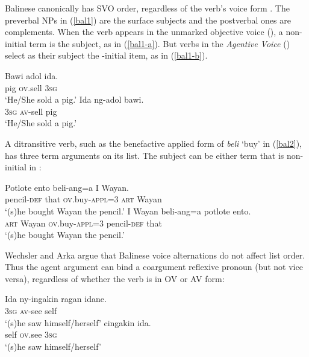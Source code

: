 \documentclass[output=paper
	        ,collection
	        ,collectionchapter
 	        ,biblatex
                ,babelshorthands
                ,newtxmath
                ,draftmode
                ,colorlinks, citecolor=brown
]{langscibook}
\begin{document}
 Balinese canonically has SVO order, regardless of the verb's voice form \citep{Artawa1994, Wechsler+Arka:1998}.  The preverbal NPs in  (\ref{bal1}) are the surface subjects and the postverbal ones are complements.  When the verb appears in the unmarked objective voice (), a non-initial term is the subject, as in (\ref{bal1-a}).    But verbs in the \emph{Agentive Voice} () select as their subject the \argst{}-initial item, as in (\ref{bal1-b}).  

\begin{exe}
	\ex\label{bal1}
\begin{xlist}
\ex \label{bal1-a}	\gll Bawi adol ida.  \\
		pig \textsc{ov}.sell \textsc{3sg}   \\
		\glt `He/She sold a pig.'
\ex	\label{bal1-b}\gll Ida ng-adol bawi.  \\
		\textsc{3sg} \textsc{av}-sell pig   \\
		\glt `He/She sold a pig.'
\end{xlist}
\end{exe} 

\noindent
A ditransitive verb,  such as the benefactive applied form of \textit{beli} `buy' in (\ref{bal2}), has three term arguments on its \argst list.  The subject can be either term that is non-initial in \argst{}:

\begin{exe}
	\ex\label{bal2}
\begin{xlist}
\ex 	\gll Potlote ento beli-ang=a I Wayan.  \\
		pencil-\textsc{def} that \textsc{ov}.buy-\textsc{appl}=3 \textsc{art} Wayan   \\
		\glt `(s)he bought Wayan the pencil.'
\ex 	\gll I Wayan beli-ang=a potlote ento.   \\
		\textsc{art} Wayan \textsc{ov}.buy-\textsc{appl}=3 pencil-\textsc{def} that   \\
		\glt `(s)he bought Wayan the pencil.'
\end{xlist}
\end{exe} 

\noindent
Wechsler and Arka argue that Balinese voice alternations  do not affect \argst list order. 
Thus the agent argument can bind a coargument reflexive pronoun (but not vice versa), regardless of whether the verb is in OV or AV form:

\begin{exe}
	\ex\label{bal3}
\begin{xlist}
\ex 	\gll Ida ny-ingakin ragan idane. \\
		\textsc{3sg} \textsc{av}-see self\\
		\glt ‘(s)he saw himself/herself’
\ex 	{} cingakin ida. \\
		self \textsc{ov}.see \textsc{3sg} \\
		\glt ‘(s)he saw himself/herself’
\end{xlist}
\end{exe} 
\end{document}
